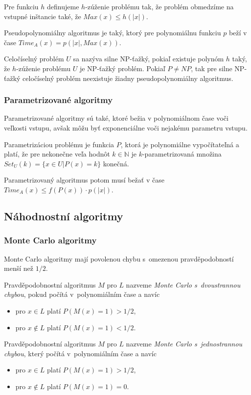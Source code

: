 Pre funkciu $h$ definujeme $h$-zúženie problému tak, že problém obmedzíme
na vstupné inštancie také, že $Max(x) \leq h(|x|)$.

Pseudopolynomiálny algoritmus je taký, ktorý pre polynomiálnu funkciu $p$ 
beží v čase $Time_A(x) = p(|x|, Max(x))$.

Celočíselný problém $U$ sa nazýva silne NP-ťažký, pokiaľ existuje polynóm $h$
taký, že $h$-zúženie problému $U$ je NP-ťažký problém. Pokiaľ $P \neq NP$, tak 
pre silne NP-ťažký celočíselný problém neexistuje žiadny pseudopolynomiálny algoritmus.

\subsubsection{Parametrizované algoritmy}
Parametrizované algoritmy sú také, ktoré bežia v polynomiálnom čase
voči veľkosti vstupu, avšak môžu byť exponenciálne voči nejakému parametru vstupu.

Parametrizáciou problému je funkcia $P$, ktorá je polynomiálne vypočítateľná
a platí, že pre nekonečne veľa hodnôt $k \in \mathbb{N}$ je $k$-parametrizovaná
množina $Set_U(k)=\{ x \in U | P(x) = k \}$ konečná.

Parametrizovaný algoritmus potom musí bežať v čase 
$Time_A(x) \leq f(P(x))\cdot p(|x|)$.

\subsection{Náhodnostní algoritmy}

\subsubsection{Monte Carlo algoritmy}

Monte Carlo algoritmy mají povolenou chybu s~omezenou pravděpodobností
menší než $1/2$.

\begin{definition}
Pravděpodobnostní algoritmus $M$ pro $L$ nazveme {\em Monte Carlo s~dvoustrannou
chybou}, pokud počítá v~polynomiálním čase
a navíc
\begin{itemize}
    \item pro $x \in L$ platí $P(M(x) = 1) > 1/2$,
    \item pro $x \not \in L$ platí $P(M(x) = 1) < 1/2$.
\end{itemize}
\end{definition}

\begin{definition}
Pravděpodobnostní algoritmus $M$ pro $L$ nazveme {\em Monte Carlo s~jednostrannou
chybou}, který počítá v~polynomiálním čase
a navíc
\begin{itemize}
    \item pro $x \in L$ platí $P(M(x) = 1) > 1/2$,
    \item pro $x \not \in L$ platí $P(M(x) = 1) = 0$.
\end{itemize}
\end{definition}


